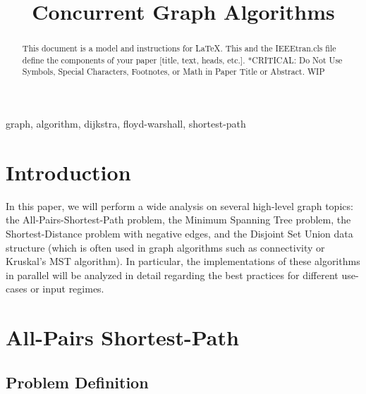 \documentclass[conference]{IEEEtran}
\begin{document}
\title{Concurrent Graph Algorithms}

\author{
\and
{}
\and
{}
\and
{}}

\maketitle

\begin{abstract}
This document is a model and instructions for \LaTeX.
This and the IEEEtran.cls file define the components of your paper [title, text, heads, etc.]. *CRITICAL: Do Not Use Symbols, Special Characters, Footnotes, 
or Math in Paper Title or Abstract. WIP
\end{abstract}

\begin{IEEEkeywords}
graph, algorithm, dijkstra, floyd-warshall, shortest-path
\end{IEEEkeywords}

\section{Introduction}
In this paper, we will perform a wide analysis on several high-level graph topics: the All-Pairs-Shortest-Path problem, the Minimum Spanning Tree problem, the Shortest-Distance problem with negative edges, and the Disjoint Set Union data structure (which is often used in graph algorithms such as connectivity or Kruskal's MST algorithm). In particular, the implementations of these algorithms in parallel will be analyzed in detail regarding the best practices for different use-cases or input regimes. 
\section{All-Pairs Shortest-Path}

\subsection{Problem Definition}
\end{document}
